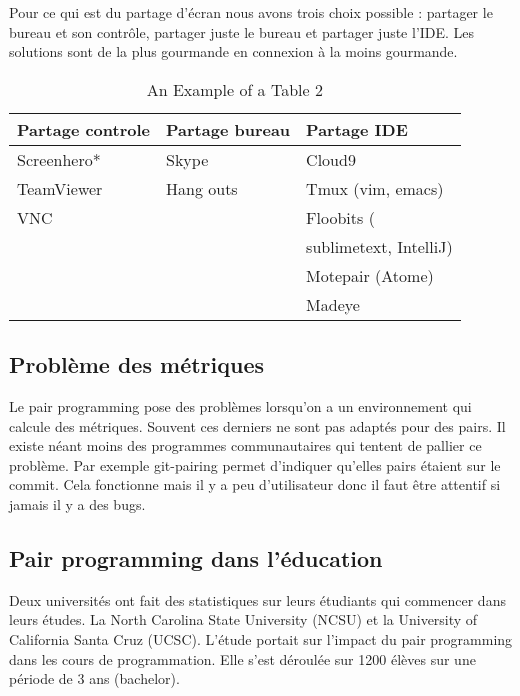 \documentclass[journal, a4paper, frenchb]{IEEEtran}
\begin{document}
Pour ce qui est du partage d’écran nous avons trois choix possible : partager le bureau et son contrôle, partager juste le bureau et partager juste l’IDE. Les solutions sont de la plus gourmande en connexion à la moins gourmande.

\begin{table*}[!t]
\begin{center}
    \caption{An Example of a Table 2}
    \label{table_example_2}
    \begin{tabular}{| l | l | l|}
    \hline
    Partage controle & Partage bureau & Partage IDE  \\ \hline
    Screenhero* & Skype & Cloud9 \\
    TeamViewer & Hang outs & Tmux (vim, emacs) \\ 
    VNC &  & Floobits ( \\
     & &  \hspace{1mm}  sublimetext, IntelliJ)\\
     & & Motepair (Atome) \\
     & & Madeye \\
    \hline
    \end{tabular}
\end{center}
\end{table*}

\subsection{Problème des métriques}

Le pair programming pose des problèmes lorsqu’on a un environnement qui calcule des métriques. Souvent ces derniers ne sont pas adaptés pour des pairs. Il existe néant moins des programmes communautaires qui tentent de pallier ce problème. Par exemple git-pairing permet d’indiquer qu’elles pairs étaient sur le commit. Cela fonctionne mais il y a peu d’utilisateur donc il faut être attentif si jamais il y a des bugs.

\subsection{Pair programming dans l’éducation}


Deux universités ont fait des statistiques sur leurs étudiants qui commencer dans leurs études. La North Carolina State University (NCSU) et la University of California Santa Cruz (UCSC). L’étude portait sur l’impact du pair programming dans les cours de programmation. Elle s’est déroulée sur
1200 élèves sur une période de 3 ans (bachelor).
\end{document}
